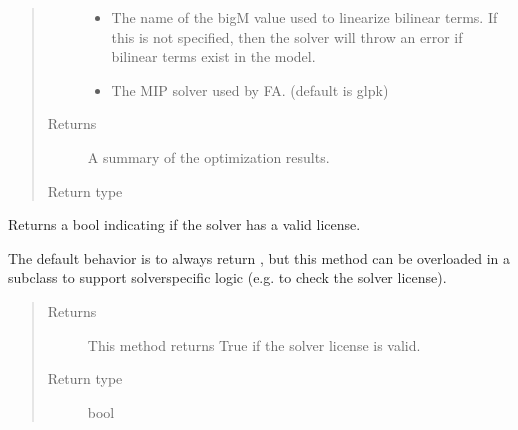 \documentclass[letterpaper,10pt,english]{sphinxmanual}
\begin{document}
\begin{fulllineitems}
\begin{fulllineitems}
\begin{quote}
\begin{description}
\begin{itemize}
\item {} 
 \textendash{} The name of the big\sphinxhyphen{}M value used to linearize bilinear terms.  If this is not specified, then the solver will throw an error if bilinear terms exist in the model.

\item {} 
 \textendash{} The MIP solver used by FA.  (default is glpk)

\end{itemize}

\item[{Returns}] \leavevmode
A summary of the optimization results.

\item[{Return type}] \leavevmode
{\hyperref[\detokenize{reference/solverapi:pao.common.solver.Results}]{}}

\end{description}\end{quote}

\end{fulllineitems}


\begin{fulllineitems}
\label{\detokenize{reference/pyomo:pao.pyomo.solvers.mpr_solvers.PyomoSubmodelSolver_FA.valid_license}}
Returns a bool indicating if the solver has a valid license.

The default behavior is to always return , but this method
can be overloaded in a subclass to support solver\sphinxhyphen{}specific logic
(e.g.  to check the solver license).
\begin{quote}\begin{description}
\item[{Returns}] \leavevmode
This method returns True if the solver license is valid.

\item[{Return type}] \leavevmode
bool

\end{description}\end{quote}

\end{fulllineitems}


\end{fulllineitems}
\end{document}

